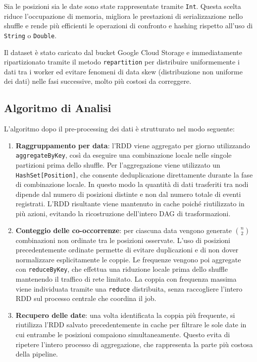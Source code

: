 \documentclass{article}
\begin{document}
Sia le posizioni sia le date sono state rappresentate tramite \texttt{Int}.
Questa scelta riduce l'occupazione di memoria, migliora le prestazioni di serializzazione nello shuffle e rende più efficienti le operazioni di confronto e hashing rispetto all'uso di \texttt{String} o \texttt{Double}.

Il dataset è stato caricato dal bucket Google Cloud Storage e immediatamente ripartizionato tramite il metodo \texttt{repartition} per distribuire uniformemente i dati tra i worker ed evitare fenomeni di data skew (distribuzione non uniforme dei dati) nelle fasi successive, molto più costosi da correggere.

\subsection{Algoritmo di Analisi}
L'algoritmo dopo il pre-processing dei dati è strutturato nel modo seguente:
\begin{enumerate}
  \item \textbf{Raggruppamento per data}: l'RDD viene aggregato per giorno utilizzando \texttt{aggregateByKey}, così da eseguire una combinazione locale nelle singole partizioni prima dello shuffle.
  Per l'aggregazione viene utilizzato un \texttt{HashSet[Position]}, che consente deduplicazione direttamente durante la fase di combinazione locale.
  In questo modo la quantità di dati trasferiti tra nodi dipende dal numero di posizioni distinte e non dal numero totale di eventi registrati.
  L'RDD risultante viene mantenuto in cache poiché riutilizzato in più azioni, evitando la ricostruzione dell'intero DAG di trasformazioni.

  \item \textbf{Conteggio delle co-occorrenze}: per ciascuna data vengono generate $\binom{n}{2}$ combinazioni non ordinate tra le posizioni osservate.
  L'uso di posizioni precedentemente ordinate permette di evitare duplicazioni e di non dover normalizzare esplicitamente le coppie.
  Le frequenze vengono poi aggregate con \texttt{reduceByKey}, che effettua una riduzione locale prima dello shuffle mantenendo il traffico di rete limitato.
  La coppia con frequenza massima viene individuata tramite una \texttt{reduce} distribuita, senza raccogliere l'intero RDD sul processo centrale che coordina il job.

  \item \textbf{Recupero delle date}: una volta identificata la coppia più frequente, si riutilizza l'RDD salvato precedentemente in cache per filtrare le sole date in cui entrambe le posizioni compaiono simultaneamente.
  Questo evita di ripetere l'intero processo di aggregazione, che rappresenta la parte più costosa della pipeline.
\end{enumerate}
\end{document}
